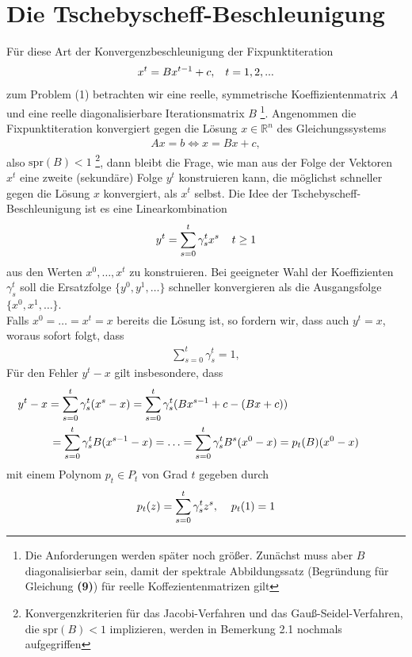 \documentclass[12pt,a4paper,numbers=endperiod]{scrartcl}
\theoremstyle{definition}
\newcommand{\spr}{\text{spr}}
\def\RR{{\mathbb R}}
\begin{document}
\newpage
\section{Die Tschebyscheff-Beschleunigung}

Für diese Art der Konvergenzbeschleunigung der Fixpunktiteration
\begin{align*}
	x^t = Bx^{t-1} +c, \hspace{3mm} t = 1,2,...	
\end{align*}
zum Problem (1) betrachten wir eine reelle, symmetrische Koeffizientenmatrix $A$ und eine reelle diagonalisierbare Iterationsmatrix $B$ \footnote{Die Anforderungen werden später noch größer. Zunächst muss aber $B$ diagonalisierbar sein, damit der spektrale Abbildungssatz (Begründung für Gleichung \textbf{(9)}) für reelle Koffezientenmatrizen gilt}. 
Angenommen die Fixpunktiteration konvergiert gegen die Lösung $x \in \RR^n$ des Gleichungssystems
\begin{gather}
	Ax = b \Leftrightarrow x = Bx + c,
\end{gather}
also $\spr(B) < 1$ \footnote{Konvergenzkriterien für das Jacobi-Verfahren und das Gauß-Seidel-Verfahren, die $\spr(B)<1$ implizieren, werden in Bemerkung 2.1 nochmals aufgegriffen}, dann bleibt die Frage, wie man aus der Folge der Vektoren $x^t$ eine zweite (sekundäre) Folge $y^t$ konstruieren kann, die möglichst schneller gegen die Lösung $x$ konvergiert, als $x^t$ selbst. Die Idee der Tschebyscheff-Beschleunigung ist es eine Linearkombination
\begin{gather}
	y^t = \sum\limits_{s = 0}^t \gamma_s^tx^s \hspace{4mm} t \geq 1
\end{gather}
aus den Werten $x^0, \ldots, x^t$ zu konstruieren. Bei geeigneter Wahl der Koeffizienten $\gamma_s^t$ soll die Ersatzfolge $\{y^0,y^1, \ldots\}$ schneller konvergieren als die Ausgangsfolge $\{x^0, x^1, \ldots\}$.\\
Falls $x^0 = \ldots = x^t = x$ bereits die Lösung ist, so fordern wir, dass auch $y^t = x$, woraus sofort folgt, dass 
\begin{gather}
	\sum\limits_{s = 0}^t \gamma_s^t = 1,
\end{gather}  
Für den Fehler $y^t - x$ gilt insbesondere, dass 
\begin{equation}
\begin{gathered}
	y^t -x = \sum\limits_{s = 0}^t \gamma_s^t(x^s -x) = \sum\limits_{s = 0}^t \gamma_s^t(Bx^{s-1} + c - (Bx + c))\hspace{33,5mm}\\
	= \sum\limits_{s = 0}^t \gamma_s^t B(x^{s-1} - x) = \ldots =\sum\limits_{s = 0}^t \gamma_s^t B^s(x^0 -x) = p_t(B)(x^0 -x)
\end{gathered}
\end{equation}
mit einem Polynom $p_t \in P_t$ von Grad $t$ gegeben durch
\begin{gather}
	p_t(z) = \sum\limits_{s = 0}^t \gamma_s^tz^s, \hspace{4mm} p_t(1) = 1
\end{gather}
\end{document}
